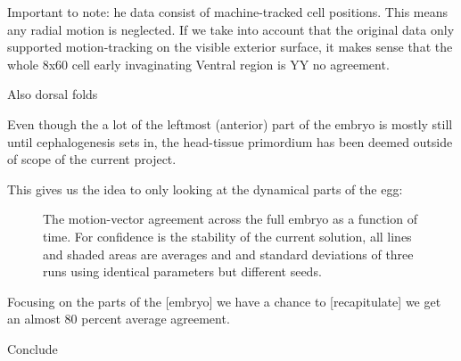 Important to note:
he data consist of machine-tracked cell positions. This means any radial motion is neglected.
If we take into account that the original data only supported motion-tracking on the visible exterior surface, it makes sense that the whole 8x60 cell early invaginating Ventral region is YY no agreement. 

Also dorsal folds

Even though the a lot of the leftmost (anterior) part of the embryo is mostly still until cephalogenesis sets in, the head-tissue primordium has been deemed outside of scope of the current project.

This gives us the idea to only looking at the dynamical parts of the egg:

\begin{figure}[H]
    \centering
    \caption{The motion-vector agreement across the full embryo as a function of time. For confidence is the stability of the current solution, all lines and shaded areas are averages and and standard deviations of three runs using identical parameters but different seeds.}
    \label{fig:motionAgreement}
\end{figure}

Focusing on the parts of the [embryo] we have a chance to [recapitulate] we get an almost 80 percent average agreement.  

Conclude


